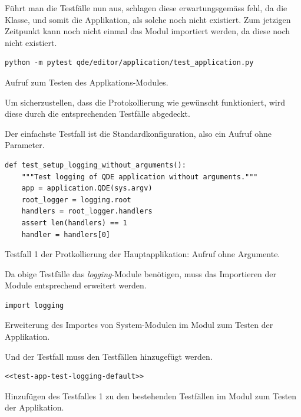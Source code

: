 \documentclass[10pt, openright, notitlepage]{scrreprt}
\begin{document}
Führt man die Testfälle nun aus, schlagen diese erwartungsgemäss fehl, da die
Klasse, und somit die Applikation, als solche noch nicht existiert. Zum jetzigen
Zeitpunkt kann noch nicht einmal das Modul importiert werden, da diese noch
nicht existiert.

\begin{listing}[H]
\begin{verbatim}
python -m pytest qde/editor/application/test_application.py
\end{verbatim}
\caption{Aufruf zum Testen des Applkations-Modules.}
\end{listing}

Um sicherzustellen, dass die Protokollierung wie gewünscht funktioniert, wird
diese durch die entsprechenden Testfälle abgedeckt.

Der einfachste Testfall ist die Standardkonfiguration, also ein Aufruf ohne
Parameter.

\begin{listing}[H]
\begin{verbatim}
def test_setup_logging_without_arguments():
    """Test logging of QDE application without arguments."""
    app = application.QDE(sys.argv)
    root_logger = logging.root
    handlers = root_logger.handlers
    assert len(handlers) == 1
    handler = handlers[0]
\end{verbatim}
\caption{\label{test-app-test-logging-default}
Testfall 1 der Protkollierung der Hauptapplikation: Aufruf ohne Argumente.}
\end{listing}

Da obige Testfälle das \emph{logging}-Module benötigen, muss das Importieren der Module
entsprechend erweitert werden.

\begin{listing}[H]
\begin{verbatim}
import logging
\end{verbatim}
\caption{\label{test-app-system-imports}
Erweiterung des Importes von System-Modulen im Modul zum Testen der Applikation.}
\end{listing}

Und der Testfall muss den Testfällen hinzugefügt werden.

\begin{listing}[H]
\begin{verbatim}
<<test-app-test-logging-default>>
\end{verbatim}
\caption{\label{test-app-test-cases}
Hinzufügen des Testfalles 1 zu den bestehenden Testfällen im Modul zum Testen der Applikation.}
\end{listing}
\end{document}
